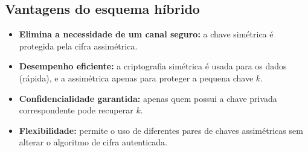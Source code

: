 \subsection{Vantagens do esquema híbrido}

\begin{itemize}
    \item \textbf{Elimina a necessidade de um canal seguro:} a chave simétrica é protegida pela cifra assimétrica.
    \item \textbf{Desempenho eficiente:} a criptografia simétrica é usada para os dados (rápida), e a assimétrica apenas para proteger a pequena chave \(k\).
    \item \textbf{Confidencialidade garantida:} apenas quem possui a chave privada correspondente pode recuperar \(k\).
    \item \textbf{Flexibilidade:} permite o uso de diferentes pares de chaves assimétricas sem alterar o algoritmo de cifra autenticada.
\end{itemize}